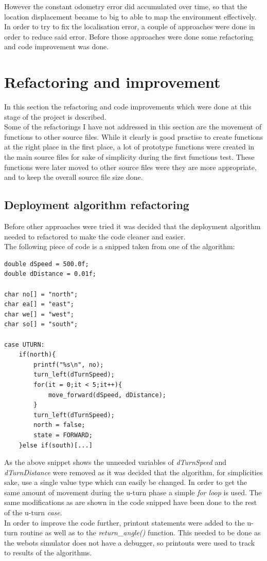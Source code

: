 However the constant odometry error did accumulated over time, so that the location displacement became to big to able to map the environment effectively. \\
In order to try to fix the localisation error, a couple of approaches were done in order to reduce said error. Before those approaches were done some refactoring and code improvement was done.

\section{Refactoring and improvement}
In this section the refactoring and code improvements which were done at this stage of the project is described. \\
Some of the refactorings I have not addressed in this section are the movement of functions to other source files.
While it clearly is good practise to create functions at the right place in the first place, a lot of prototype functions were created in the main source files for sake of simplicity during the first functions test. These functions were later moved to other source files were they are more appropriate, and to keep the overall source file size done.

\subsection{Deployment algorithm refactoring}
Before other approaches were tried it was decided that the deployment algorithm needed to refactored to make the code cleaner and easier. \\
The following piece of code is a snipped taken from one of the algorithm:

\begin{lstlisting}[caption={Deployment algorithm refactoring}]
double dSpeed = 500.0f;
double dDistance = 0.01f;

char no[] = "north";
char ea[] = "east";
char we[] = "west";
char so[] = "south";

case UTURN:
    if(north){
        printf("%s\n", no);
        turn_left(dTurnSpeed);
        for(it = 0;it < 5;it++){
            move_forward(dSpeed, dDistance);
        }
        turn_left(dTurnSpeed);
        north = false;
        state = FORWARD;
    }else if(south)[...]
\end{lstlisting}

As the above snippet shows the unneeded variables of \textit{dTurnSpeed} and \textit{dTurnDistance} were removed as it was decided that the algorithm, for simplicities sake, use a single value type which can easily be changed. In order to get the same amount of movement during the u-turn phase a simple \textit{for loop} is used. The same modifications as are shown in the code snipped have been done to the rest of the u-turn \textit{case}. \\
In order to improve the code further, printout statements were added to the u-turn routine as well as to the \textit{return\_angle()} function.
This needed to be done as the webots simulator does not have a debugger, so printouts were used to track to results of the algorithms.

